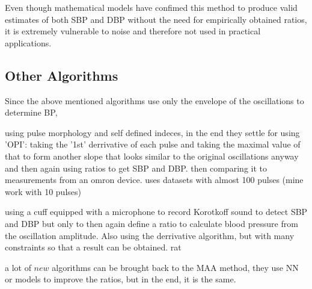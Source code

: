 Even though mathematical models have confimed this method to produce valid estimates of both SBP and DBP without the need for empirically obtained ratios, it is extremely vulnerable to noise and therefore not used in practical applications.  \cite{Babbs2012,Chandrasekhar2019}

%



\subsection{Other Algorithms}
Since the above mentioned algorithms use only the envelope of the oscillations to determine BP, 


using pulse morphology and self defined indeces, in the end they settle for using 'OPI': taking the '1st' derrivative of each pulse and taking the maximal value of that to form another slope that looks similar to the original oscillations anyway and then again using ratios to get SBP and DBP. then comparing it to measurements from an omron device. uses datasets with almost 100 pulses (mine work with 10 pulses) \cite{Mafi2012,Mafi2011}

using a cuff equipped with a microphone to record Korotkoff sound to detect SBP and DBP but only to then again define a ratio to calculate blood pressure from the oscillation amplitude. Also using the derrivative algorithm, but with many constraints so that a result can be obtained. rat\cite{Jazbinsek2010,Jazbinsek2005,Jazbinsek2016}


a lot of $new$ algorithms can be brought back to the MAA method, they use NN or models to improve the ratios, but in the end, it is the same.